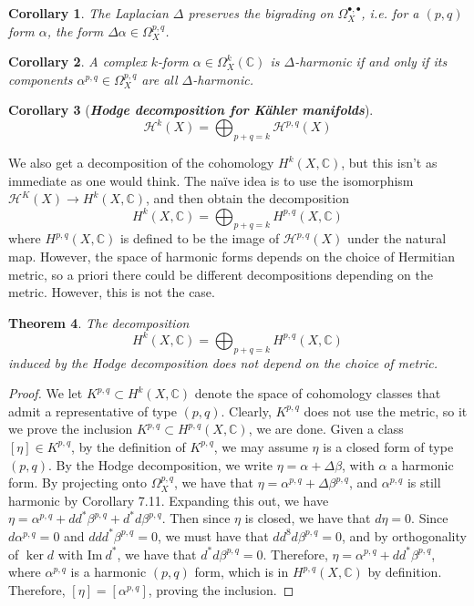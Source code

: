 \documentclass[psamsfonts, 12pt]{amsart}
\newtheorem{thm}{Theorem}[section]
\newtheorem{cor}[thm]{Corollary}
\theoremstyle{definition}
\theoremstyle{remark}
\newcommand{\ib}[1]{\textbf{\textit{#1}}}
\newcommand{\C}{\mathbb{C}}
\begin{document}
%
\begin{cor}
The Laplacian $\Delta$ preserves the bigrading on $\Omega_X^{\bullet,\bullet}$,
i.e. for a $(p,q)$ form $\alpha$, the form $\Delta\alpha \in \Omega_X^{p,q}$.
\end{cor}
%
\begin{cor}
A complex $k$-form $\alpha \in \Omega^k_X(\C)$ is $\Delta$-harmonic if and only if
its components $\alpha^{p,q} \in \Omega^{p,q}_X$ are all $\Delta$-harmonic.
\end{cor}
%
\begin{cor}[\ib{Hodge decomposition for K\"ahler manifolds}]
\[
\mathcal{H}^k(X) = \bigoplus_{p+q=k}\mathcal{H}^{p,q}(X)
\]
\end{cor}
%
We also get a decomposition of the cohomology $H^k(X,\C)$, but this isn't as immediate
as one would think. The na\"ive idea is to use the isomorphism
$\mathcal{H}^K(X) \to H^k(X,\C)$, and then obtain the decomposition
\[
H^k(X,\C) = \bigoplus_{p+q=k}H^{p,q}(X,\C)
\]
where $H^{p,q}(X,\C)$ is defined to be the image of $\mathcal{H}^{p,q}(X)$ under
the natural map. However, the space of harmonic forms depends on the choice of Hermitian
metric, so a priori there could be different decompositions depending on the metric.
However, this is not the case.
%
\begin{thm}
The decomposition
\[
H^k(X,\C) = \bigoplus_{p+q=k}H^{p,q}(X,\C)
\]
induced by the Hodge decomposition does not depend on the choice of metric.
\end{thm}
%
\begin{proof}
We let $K^{p,q} \subset H^k(X,\C)$ denote the space of cohomology classes that admit a
representative of type $(p,q)$. Clearly, $K^{p,q}$ does not use the metric, so it
we prove the inclusion $K^{p,q} \subset H^{p,q}(X,\C)$, we are done. Given a class
$[\eta] \in K^{p,q}$, by the definition of $K^{p,q}$, we may assume $\eta$ is a
closed form of type $(p,q)$. By the Hodge decomposition, we write
$\eta = \alpha + \Delta\beta$, with $\alpha$ a harmonic form. By projecting onto
$\Omega^{p,q}_X$, we have that $\eta = \alpha^{p,q} + \Delta\beta^{p,q}$, and
$\alpha^{p,q}$ is still harmonic by Corollary 7.11. Expanding this out, we have
$\eta = \alpha^{p,q} + dd^*\beta^{p,q} + d^*d\beta^{p,q}$. Then since $\eta$ is closed,
we have that $d\eta = 0$. Since $d\alpha^{p,q} = 0$ and $ddd^*\beta^{p,q} = 0$, we
must have that $dd^8d\beta^{p,q} = 0$, and by orthogonality of $\ker d$ with
$\mathrm{Im}~d^*$, we have that $d^*d\beta^{p,q} = 0$. Therefore,
$\eta = \alpha^{p,q} + dd^*\beta^{p,q}$, where $\alpha^{p,q}$ is a harmonic $(p,q)$
form, which is in $H^{p,q}(X,\C)$ by definition. Therefore, $[\eta] = [\alpha^{p,q}]$,
proving the inclusion.
\end{proof}
\end{document}
